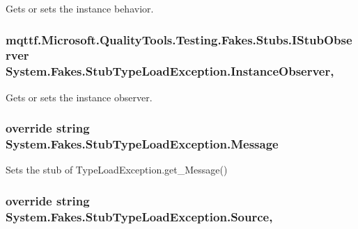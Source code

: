 Gets or sets the instance behavior.

\hypertarget{class_system_1_1_fakes_1_1_stub_type_load_exception_ada40f0ca3d0eadef7034c41ab01eee99}{
\subsubsection[{Instance\-Observer}]{\setlength{\rightskip}{0pt plus 5cm}mqttf.\-Microsoft.\-Quality\-Tools.\-Testing.\-Fakes.\-Stubs.\-I\-Stub\-Observer System.\-Fakes.\-Stub\-Type\-Load\-Exception.\-Instance\-Observer\hspace{0.3cm}{\ttfamily [get]}, {\ttfamily [set]}}}\label{class_system_1_1_fakes_1_1_stub_type_load_exception_ada40f0ca3d0eadef7034c41ab01eee99}


Gets or sets the instance observer.

\hypertarget{class_system_1_1_fakes_1_1_stub_type_load_exception_a69de22efd51cbc6087b92fd85704abff}{
\subsubsection[{Message}]{\setlength{\rightskip}{0pt plus 5cm}override string System.\-Fakes.\-Stub\-Type\-Load\-Exception.\-Message\hspace{0.3cm}{\ttfamily [get]}}}\label{class_system_1_1_fakes_1_1_stub_type_load_exception_a69de22efd51cbc6087b92fd85704abff}


Sets the stub of Type\-Load\-Exception.\-get\-\_\-\-Message()

\hypertarget{class_system_1_1_fakes_1_1_stub_type_load_exception_a3296bd508b8b5ecc4410b58b08be3479}{
\subsubsection[{Source}]{\setlength{\rightskip}{0pt plus 5cm}override string System.\-Fakes.\-Stub\-Type\-Load\-Exception.\-Source\hspace{0.3cm}{\ttfamily [get]}, {\ttfamily [set]}}}\label{class_system_1_1_fakes_1_1_stub_type_load_exception_a3296bd508b8b5ecc4410b58b08be3479}


